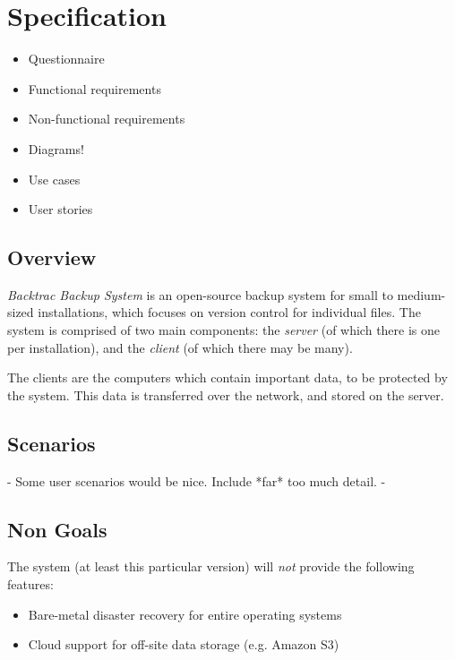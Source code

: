 \chapter{Specification}

\begin{itemize}
    \item Questionnaire
    \item Functional requirements
    \item Non-functional requirements
    \item Diagrams!
    \item Use cases
    \item User stories
\end{itemize}

\section{Overview}

\emph{Backtrac Backup System} is an open-source backup system for small to
medium-sized installations, which focuses on version control for individual
files. The system is comprised of two main components: the \emph{server} (of
which there is one per installation), and the \emph{client} (of which there
may be many).

The clients are the computers which contain important data, to be
protected by the system. This data is transferred over the network, and stored
on the server.

\section{Scenarios}

 - Some user scenarios would be nice. Include *far* too much detail. -

\section{Non Goals}

The system (at least this particular version) will \emph{not} provide the
following features:

\begin{itemize}
    \item Bare-metal disaster recovery for entire operating systems
    \item Cloud support for off-site data storage (e.g. Amazon S3)
\end{itemize}
